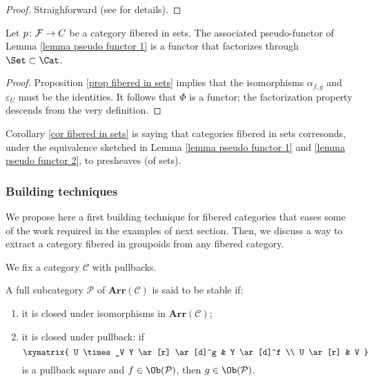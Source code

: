 \begin{proof}
Straighforward (see  for details).
\end{proof}

\begin{cor} \label{cor fibered in sets}
Let $p \colon \mathcal F \to \mathcal \mathcal C$ be a category fibered in sets. The associated pseudo-functor of Lemma \ref{lemma pseudo functor 1} is a functor that factorizes through $\Set \subset \Cat$.
\end{cor}

\begin{proof}
Proposition \ref{prop fibered in sets} implies that the isomorphisms $\alpha_{f,g}$ and $\varepsilon_U$ must be the identities. It follows that $\Phi$ is a functor; the factorization property descends from the very definition.
\end{proof}

\begin{rmk} \label{rmk fibered in sets}
Corollary \ref{cor fibered in sets} is saying that categories fibered in sets corresonds, under the equivalence sketched in Lemma \ref{lemma pseudo functor 1} and \ref{lemma pseudo functor 2}, to presheaves (of sets).
\end{rmk}

\subsubsection{Building techniques}

We propose here a first building technique for fibered categories that eases some of the work required in the examples of next section. Then, we discuss a way to extract a category fibered in groupoids from any fibered category.

We fix a category $\mathcal C$ with pullbacks.

\begin{defin} \label{def stable arrows}
A full subcategory $\mathcal P$ of $\mathbf{Arr}(\mathcal C)$ is said to be stable if:
\begin{enumerate}
\item it is closed under isomorphisms in $\mathbf{Arr}(\mathcal C)$;
\item it is closed under pullback: if
\[
\xymatrix{
U \times_V Y \ar[r] \ar[d]^g & Y \ar[d]^f \\ U \ar[r] & V
}
\]
is a pullback square and $f \in \Ob(\mathcal P)$, then $g \in \Ob(\mathcal P)$.
\end{enumerate}
\end{defin}

